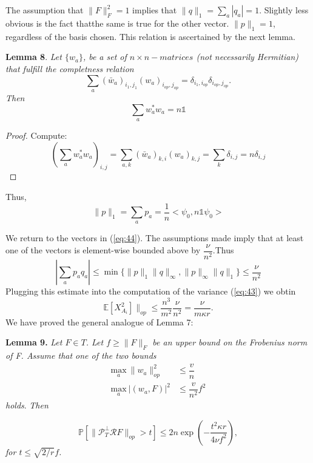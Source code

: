 \documentclass{article}
\begin{document}
The assumption that $\|F\|_F^2 = 1$ implies that $\|q\|_1 = \sum_a|q_a| = 1$. Slightly less obvious is the fact thatthe same is true for the other vector. $\|p\|_1 = 1$, regardless of the basis chosen. This relation is ascertained by the next lemma.

\textbf{Lemma 8}. \textit{Let $\lbrace w_a \rbrace$, be a set of $n \times n-matrices$ (not necessarily Hermitian) that fulfill the completness relation}
\begin{equation}
\sum_a(\bar{w}_a)_{i_1,j_1}(w_a)_{i_{op},j_{op}} = \delta_{i_1,i_{op}}\delta_{i_{op},j_{op}}.
\end{equation}
\textit{Then}
\[
\sum_a w_a^* w_a = n\mathbb{1}
\]

\begin{proof}
Compute:
\[
\left(\sum_a w_a^* w_a\right)_{i,j} = \sum_{a,k}(\bar{w}_a)_{k,i}(w_a)_{k,j} = \sum_k \delta_{i,j} = n\delta_{i,j}
\]
\end{proof}

Thus,
\[
\|p\|_1 = \sum_ap_a = \dfrac{1}{n}<\psi_0,n\mathbb{1}\psi_0>
\]

We return to the vectors in (\ref{eq:44}). The assumptions made imply that at least one of the vectors is element-wise bounded above by $\dfrac{\nu}{n^2}$.Thus
\begin{equation}
\left|\sum_ap_aq_a\right| \le \min\lbrace \|p\|_1 \|q\|_\infty,\|p\|_\infty \|q\|_1 \rbrace \le \dfrac{\nu}{n^2}
\end{equation}
Plugging this estimate into the computation of the variance (\ref{eq:43}) we obtin
\[
\mathbb{E}[X_{A_i}^2]\|_{op} \le \dfrac{n^3}{m^2}\dfrac{\nu}{n^2} = \dfrac{\nu}{m\kappa r}.
\]
We have proved the general analogue of Lemma 7:

\textbf{Lemma 9.} \textit{Let $F \in T$. Let $f\ge \|F\|_F$ be an upper bound on the Frobenius norm of F. Assume that one of the two bounds}
\begin{align}
\underset{a} {\mathrm{max}} ~\|w_a\|_{op}^2 & \le \dfrac{v}{n}\\
\underset{a} {\mathrm{max}} ~|(w_a,F)|^2 & \le \dfrac{v}{n^2}f^2
\end{align}
\textit{holds}. \textit{Then}

\begin{equation}
\mathbb{P} \left[  \|\mathcal{P}_T^\perp\mathcal{R}F\|_{op} >t    \right] \le 2n \exp\left(-\dfrac{t^2\kappa r}{4\nu f^2} \right),
\end{equation}
\textit{for $t\le \sqrt{2/r}f$.}
\end{document}
